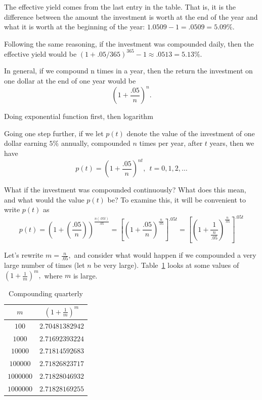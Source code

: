 The effective yield comes from the last entry in the table.  That is,
it is the difference between the amount the investment is worth at the
end of the year and what it is worth at the beginning of the year:
$1.0509-1=.0509=5.09\%.$

Following the same reasoning, if the investment was compounded daily,
then the effective yield would be $(1+.05/365)^{365}-1\approx.0513=5.13\%.$   

In general, if we compound n times in a year, then the return the
investment on one dollar at the end of one year would be
$$
\left(1+\frac{.05}{n}\right)^n.
$$

  Doing exponential function first, then
logarithm

Going one step further, if we let $p(t)$ denote the value of the investment of one dollar earning $5\%$ annually, compounded $n$ times per year, after $t$ years, then we have
$$
p(t)=\left(1+\frac{.05}{n}\right)^{nt}, \ \ t=0,1,2,\ldots
$$

What if the investment was compounded continuously?  What does this
mean, and what would the value $p(t)$ be?  To examine this, it will be
convenient to write $p(t)$ as
$$
p(t)=\left(1+\left(\frac{.05}{n}\right)\right)^{\frac{n(.05t)}{.05}}
=\left[\left(1+\frac{.05}{n}\right)^{\frac{n}{.05}}\right]^{.05t}
=\left[\left(1+\frac{1}{\frac{n}{.05}}\right)^{\frac{n}{.05}}\right]^{.05t}
$$

Let's rewrite $m=\frac{n}{.05},$ and consider what would happen if we
compounded a very large number of times (let $n$ be very large).
Table~\ref{tab:4} looks at some values of
$\left(1+\frac{1}{m}\right)^m,$ where $m$ is large.
\begin{table}[h]
  \centering
  \begin{tabular}{|c|c|}\hline{}
     $m$        & $\left(1+\frac{1}{m}\right)^m$\\\hline
    $100$       & $2.70481382942$ \\\hline
    $1000$      & $2.71692393224$ \\\hline
    $10000$     & $2.71814592683$ \\\hline
    $100000$    & $2.71826823717$ \\\hline
    $1000000$   & $2.71828046932$ \\\hline
    $1000000$   & $2.71828169255$ \\\hline
  \end{tabular}
  \caption{Compounding quarterly}
  \label{tab:4}
\end{table}

